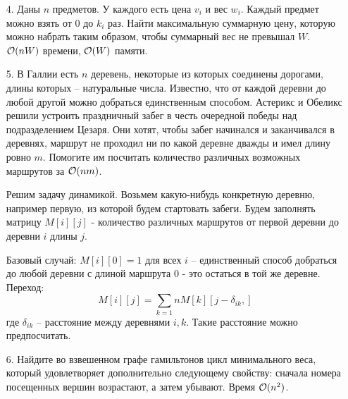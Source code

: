 \begin{enumerate}
  \item[4.]
    Даны $n$ предметов. У каждого есть цена $v_i$ и вес $w_i$. Каждый предмет можно взять
    от $0$ до $k_i$ раз. Найти максимальную суммарную цену,
    которую можно набрать таким образом, чтобы суммарный вес не превышал $W$.
    $\mathcal{O}(nW)$ времени, $\mathcal{O}(W)$ памяти.

  \item[5.] 
    В Галлии есть $n$ деревень, некоторые из которых соединены дорогами, длины которых --
    натуральные числа. Известно, что от каждой деревни до любой другой можно добраться
    единственным способом. Астерикс и Обеликс решили устроить праздничный забег в честь
    очередной победы над подразделением Цезаря. Они хотят, чтобы забег начинался и заканчивался
    в деревнях, маршрут не проходил ни по какой деревне дважды и имел длину ровно $m$.
    Помогите им посчитать количество различных возможных маршрутов за $\mathcal{O}(nm)$.
    \begin{solution}
      Решим задачу динамикой. Возьмем какую-нибудь конкретную деревню, например первую, из которой будем стартовать забеги. Будем заполнять матрицу $M[i][j]$ - количество различных маршрутов от первой деревни до деревни $i$ длины $j$.

      Базовый случай: $M[i][0]=1$ для всех $i$ -- единственный способ добраться до любой деревни с длиной маршрута 0 - это остаться в той же деревне.
      Переход:
      \begin{equation}
        M[i][j] = \sum_{k=1}{n} M[k][j-\delta_{ik},]
      \end{equation}
      где $\delta_{ik}$ -- расстояние между деревнями $i, k$. Такие расстояние можно предпосчитать.
    \end{solution}

  \item[6.]
    Найдите во взвешенном графе гамильтонов цикл
    минимального веса, который удовлетворяет дополнительно следующему свойству: сначала
    номера посещенных вершин возрастают, а затем убывают. Время $\mathcal{O}(n^2)$.



\end{enumerate}
